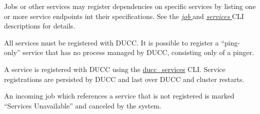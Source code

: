       Jobs or other services may register dependencies on specific services by listing one or more
      service endpoints int their specifications. See the 
      \hyperref[sec:cli.ducc-submit]{\em job } and 
      \hyperref[sec:cli.ducc-services]{\em services } CLI descriptions for details.
           
      All services must be registered with DUCC.  It is
      possible to register a ``ping-only'' service that has no process managed by DUCC,
      consisting only of a pinger.  
            
      A service is registered with DUCC using the
      \hyperref[sec:cli.ducc-services]{ducc\_services} CLI. Service registrations are persisted by
      DUCC and last over DUCC and cluster restarts.

      An incoming job which references a service that is not registered is marked ``Services
      Unavailable'' and canceled by the system.

